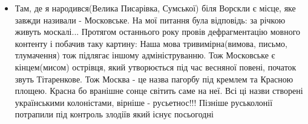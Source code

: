 \begin{itemize}
\item {}
Там, де я народився(Велика Писарівка, Сумської) біля Ворскли є місце, яке завжди називали - Московське. На мої питання була відповідь: за річкою живуть москалі...
Протягом останнього року провів дефрагментацію мовного контенту і побачив таку картину:
Наша мова тривимірна(вимова, письмо, тлумачення) тож підлягає іншому адмініструванню.
Тож Московське є кінцем(мисом) острівця, який утворюється під час весняної повені, початок звуть Тітаренкове.
Тож Москва - це назва пагорбу під кремлем та Красною площею.
Красна бо вранішне сонце світить саме на неї.
Всі ці назви створені українськими колоністами, вірніше - русьетнос!!!
Пізніше руськолонії потрапили під контроль злодіїв який існує посьогодні
\end{itemize}
